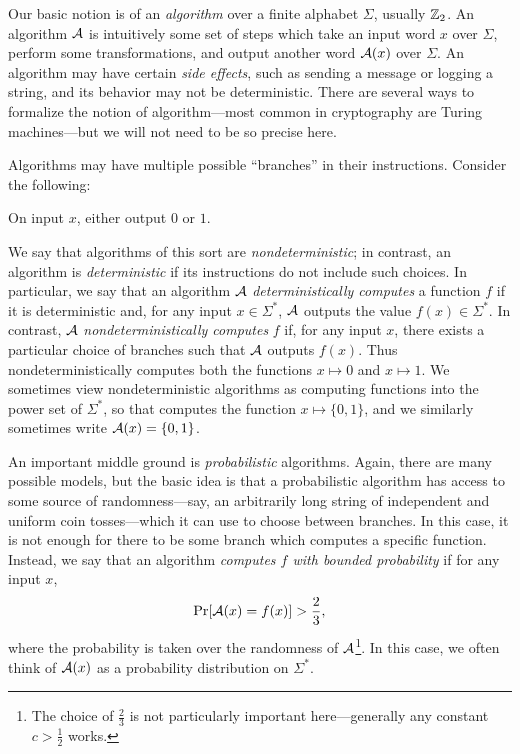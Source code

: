 Our basic notion is of an \emph{algorithm} over a finite alphabet $\Sigma$,
usually $\mathbb{Z}_2$. An algorithm $\mathcal{A}$ is intuitively some set of steps which take
an input word $x$ over $\Sigma$, perform some transformations, and output
another word $\mathcal{A}(x)$ over $\Sigma$. An algorithm may have certain \emph{side
effects}, such as sending a message or logging a string, and its behavior may
not be deterministic. There are several ways to formalize the notion of
algorithm---most common in cryptography are Turing machines---but we will not
need to be so precise here.

Algorithms may have multiple possible ``branches'' in their instructions.
Consider the following:

\begin{_algo}\label{alg:nondeterministic}
  On input $x$, either output $0$ or $1$.
\end{_algo}

We say that algorithms of this sort are \emph{nondeterministic}; in contrast, an
algorithm is \emph{deterministic} if its instructions do not include such
choices. In particular, we say that an algorithm $\mathcal{A}$ \emph{deterministically
computes} a function $f$ if it is deterministic and, for any input $x\in
\Sigma^*$, $\mathcal{A}$ outputs the value $f(x)\in\Sigma^*$. In contrast, $\mathcal{A}$
\emph{nondeterministically computes} $f$ if, for any input $x$, there exists a
particular choice of branches such that $\mathcal{A}$ outputs $f(x)$. Thus
 nondeterministically computes both
the functions $x\mapsto 0$ and $x\mapsto 1$. We sometimes view nondeterministic
algorithms as computing functions into the power set of $\Sigma^*$, so that
 computes the function $x\mapsto\{0,
1\}$, and we similarly sometimes write $\mathcal{A}(x) = \{0, 1\}$.

An important middle ground is \emph{probabilistic} algorithms. Again, there are
many possible models, but the basic idea is that a probabilistic algorithm has
access to some source of randomness---say, an arbitrarily long string of
independent and uniform coin tosses---which it can use to choose between
branches. In this case, it is not enough for there to be some branch which
computes a specific function. Instead, we say that an algorithm \emph{computes
$f$ with bounded probability} if for any input $x$, \[
  \Pr[\mathcal{A}(x) = f(x)] > \frac{2}{3},
\]where the probability is taken over the randomness of $\mathcal{A}$\footnote{The
  choice of $\frac{2}{3}$ is not particularly important here---generally any constant
$c>\frac{1}{2}$ works.}. In this case, we
often think of $\mathcal{A}(x)$ as a probability distribution on $\Sigma^*$.

